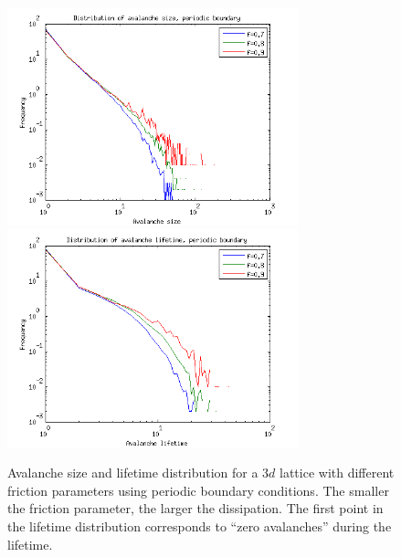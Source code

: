\begin{figure}
\begin{center}
\includegraphics[width=0.75\textwidth]{results/3spfmulti.png}
\includegraphics[width=0.75\textwidth]{results/3tpfmulti.png}
\caption{Avalanche size and lifetime distribution for a $3d$ lattice with different friction parameters using periodic boundary conditions. The smaller the friction parameter, the larger the dissipation. The first point in the lifetime distribution corresponds to ``zero avalanches'' during the lifetime. }
\label{3spf}
\end{center}
\end{figure}



